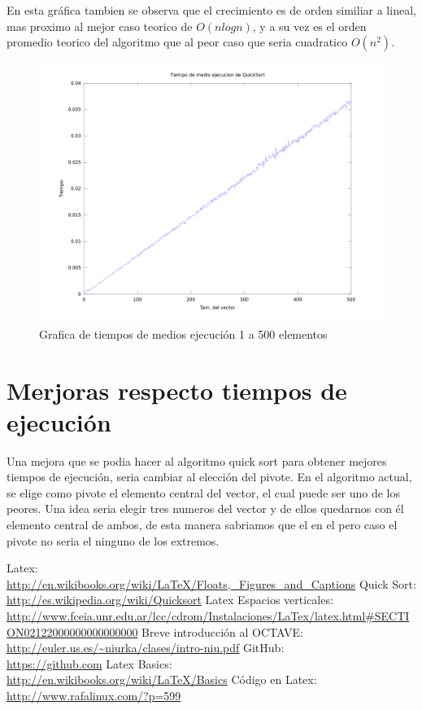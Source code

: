 \documentclass[a4,12pt]{article}
\begin{document}
En esta gráfica tambien se observa que el crecimiento es de orden similiar a lineal, mas proximo al mejor caso teorico de $O(nlogn)$, y a su vez es el orden promedio teorico del algoritmo que al peor caso que seria cuadratico $O(n^2)$.
\begin{figure}[h]
\includegraphics[width=1\textwidth]{Graficos/tiemposMedios}
\caption{Grafica de tiempos de medios ejecución 1 a 500 elementos}
\label{fig:tiemposMedios}
\end{figure}

\section{Merjoras respecto tiempos de ejecución}
Una mejora que se podia hacer al algoritmo quick sort para obtener mejores tiempos de ejecución, seria cambiar al elección del pivote. 
En el algoritmo actual, se elige como pivote el elemento central del vector, el cual puede ser uno de los peores. Una idea seria elegir tres numeros del vector y de ellos quedarnos con él elemento central de ambos, de esta manera sabriamos que el en el pero caso el pivote no seria el ninguno de los extremos.

\newpage
\begin{thebibliography}{99}
 Latex:\\ \url{http://en.wikibooks.org/wiki/LaTeX/Floats,_Figures_and_Captions}
 Quick Sort:\\ \url{http://es.wikipedia.org/wiki/Quicksort}
 Latex Espacios verticales: \\ \url{http://www.fceia.unr.edu.ar/lcc/cdrom/Instalaciones/LaTex/latex.html#SECTION02122000000000000000}
 Breve introducción al OCTAVE: \\ \url{http://euler.us.es/~niurka/clases/intro-niu.pdf}
 GitHub: \\ \url{https://github.com}
 Latex Basics: \\ \url{http://en.wikibooks.org/wiki/LaTeX/Basics}
 Código en Latex: \\ \url{http://www.rafalinux.com/?p=599}

\end{thebibliography}
\end{document}
